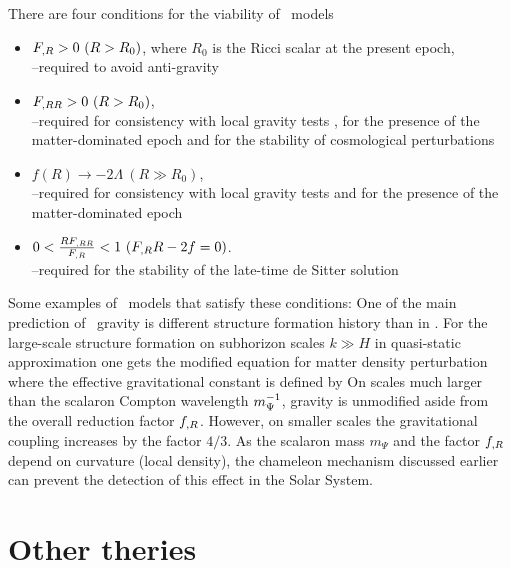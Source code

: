 There are four conditions for the viability of \fR\ models \parencite{Amendola_2007}
\begin{itemize}
	\item $F_{,R}>0\ (R>R_0)$, where $R_0$ is the Ricci scalar at the present epoch,\\
	--required to avoid anti-gravity \parencite{2010deto.book.....A}\\
	\item $F_{,RR}>0\ (R>R_0)$,\\
	--required for consistency with local gravity tests \parencite{2005gr.qc.....5136O}, for the presence of the matter-dominated epoch \parencite{2007PhRvL..98m1302A} and for the stability of cosmological perturbations \parencite{2007PhRvD..75d4004S}\\
	\item $f(R)\rightarrow -2\Lambda\ (R\gg R_0)$,\\
	--required for consistency with local gravity tests \parencite{2008PhRvD..77b3507T} and for the presence of the matter-dominated epoch \parencite{Amendola_2007}\\
	\item $0<\frac{RF_{,RR}}{F_{,R}}<1\ (F_{,R} R-2f=0)$.\\
		--required for the stability of the late-time de Sitter solution \parencite{1988PhLB..202..198M}
\end{itemize}
Some examples of \fR\ models that satisfy these conditions:
One of the main prediction of \fR\ gravity is different structure formation history than in \LCDM. For the large-scale structure formation on subhorizon scales \mbox{$k\gg H$} in quasi-static approximation one gets the modified equation for matter density perturbation \cite{2011RSPTA.369.4947B}
where the effective gravitational constant is defined by
On scales much larger than the scalaron Compton wavelength $m_\Psi^{-1}$, gravity is unmodified aside from the overall reduction factor $f_{,R}$. However, on smaller scales the gravitational coupling increases by the factor $4/3$. As the scalaron mass $m_\Psi$ and the factor $f_{,R}$ depend on curvature (local density), the chameleon mechanism discussed earlier can prevent the detection of this effect in the Solar System.
\section{Other theries}